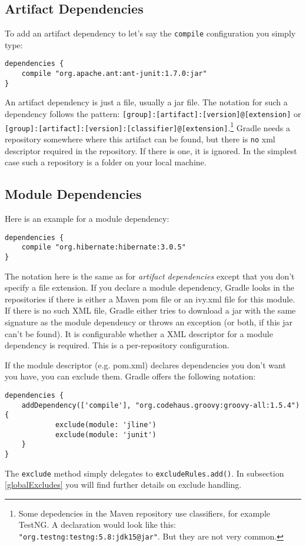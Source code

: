 \subsection{Artifact Dependencies} %
\label{sub:artifact_dependencies}
To add an artifact dependency to let's say the \texttt{compile} configuration you simply type:
\begin{Verbatim}
dependencies {
	compile "org.apache.ant:ant-junit:1.7.0:jar"
}
\end{Verbatim}
An artifact dependency is just a file, usually a jar file. The notation for such a dependency follows the  pattern: \texttt{[group]:[artifact]:[version]@[extension]} or \texttt{[group]:[artifact]:[version]:[classifier]@[extension]}.\footnote{Some depedencies in the Maven repository use classifiers, for example TestNG. A declaration would look like this: \texttt{"org.testng:testng:5.8:jdk15@jar"}. But they are not very common.} Gradle needs a repository somewhere where this artifact can be found, but there is \texttt{no} xml descriptor required in the repository. If there is one, it is ignored. In the simplest case such a repository is a folder on your local machine. 

\subsection{Module Dependencies} %
\label{sub:module_dependencies}
Here is an example for a module dependency:
\begin{Verbatim}
dependencies {
	compile "org.hibernate:hibernate:3.0.5"
}
\end{Verbatim}
The notation here is the same as for \emph{artifact dependencies} except that you don't specify a file extension. If you declare a module dependency, Gradle looks in the repositories if there is either a Maven pom file or an ivy.xml file for this module. If there is no such XML file, Gradle either tries to download a jar with the same signature as the module dependency or throws an exception (or both, if this jar can't be found). It is configurable whether a XML descriptor for a module dependency is required. This is a per-repository configuration.

If the module descriptor (e.g. pom.xml) declares dependencies you don't want you have, you can exclude them. Gradle offers the following notation:
\begin{Verbatim}
dependencies {
	addDependency(['compile'], "org.codehaus.groovy:groovy-all:1.5.4") {
	        exclude(module: 'jline')
	        exclude(module: 'junit')
	}
}
\end{Verbatim}
The \texttt{exclude} method simply delegates to \texttt{excludeRules.add()}. In subsection \ref{globalExcludes} you will find further details on exclude handling.

